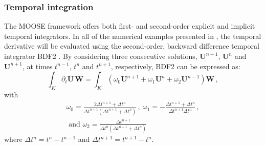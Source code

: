 \documentclass[preprint,10pt]{elsarticle}
\begin{document}
\subsubsection{Temporal integration} 
%
The MOOSE framework offers both first- and second-order explicit and implicit temporal integrators. 
In all of the numerical examples presented in , the temporal derivative  will be 
evaluated using the second-order, backward difference temporal integrator BDF2 \cite{bdf2}. By considering three 
consecutive solutions, $\mathbf U^{n-1}$, $\mathbf U^n$ and $\mathbf U^{n+1}$, at times $t^{n-1}$, $t^n$ and $t^{n+1}$, respectively, BDF2 can be expressed as:
\begin{equation}
\label{eq:BDF2}
\int_{K} \partial_t \mathbf U \, \mathbf  W = \int_{K} \left( \omega_0 \mathbf U^{n+1}  + \omega_1 \mathbf U^n + \omega_2 \mathbf U^{n-1} \right) \mathbf W \,,
\end{equation}
%
with
\begin{multline}
\omega_0 =\frac{2\Delta t^{n+1}+\Delta t^n}{\Delta t^{n+1} \left( \Delta t^{n+1}+\Delta t^n \right)} \, , \ 
\omega_1 = -\frac{\Delta t^{n+1}+\Delta t^n}{\Delta t^{n+1} \Delta t^n}  \, , \\
\text{ and } \omega_2 = \frac{\Delta t^{n+1}}{\Delta t^n \left( \Delta t^{n+1} + \Delta t^n \right)} \nonumber
\end{multline}
where $\Delta t^{n} = t^n-t^{n-1}$ and $\Delta t^{n+1} = t^{n+1}-t^{n}$.
%
\end{document}
